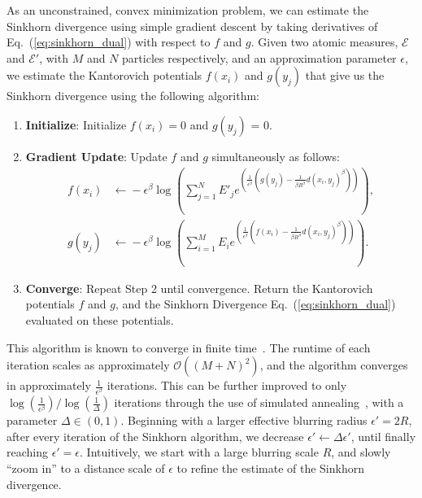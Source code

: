 \documentclass[letterpaper,11pt]{article}
\newcommand{\E}{\mathcal{E}}
\DeclareRobustCommand{\Eq}[1]{Eq.~(\ref{eq:#1})}
\begin{document}


As an unconstrained, convex minimization problem, we can estimate the Sinkhorn divergence using simple gradient descent by taking derivatives of \Eq{sinkhorn_dual} with respect to $f$ and $g$. Given two atomic measures, $\E$ and $\E'$, with $M$ and $N$ particles respectively, and an approximation parameter $\epsilon$, we estimate the Kantorovich potentials $f(x_i)$ and $g(y_j)$ that give us the Sinkhorn divergence using the following algorithm:
%
\begin{enumerate}
    \item \textbf{Initialize}: Initialize $f(x_i) = 0$ and $g(y_j)$ = 0.
    \item \textbf{Gradient Update}: Update $f$ and $g$ simultaneously as follows:
    \begin{align}
    f(x_i) &\xleftarrow{} -\epsilon^\beta \log( \sum_{j=1}^N E'_j e^{\left(\frac{1}{\epsilon^\beta}(g(y_j) - \frac{1}{\beta R^\beta}d(x_i,y_j)^\beta)\right)} ),\\
    g(y_j) &\xleftarrow{} -\epsilon^\beta \log( \sum_{i=1}^M E_i e^{\left(\frac{1}{\epsilon^\beta}(f(x_i) - \frac{1}{\beta R^\beta}d(x_i,y_j)^\beta)\right)} ).
    \end{align}
    \item \textbf{Converge}: Repeat Step 2 until convergence. Return the Kantorovich potentials $f$ and $g$, and the Sinkhorn Divergence \Eq{sinkhorn_dual} evaluated on these potentials.
\end{enumerate}
%
This algorithm is known to converge in finite time~\cite{sinkhorn_1966, sinkhorn1967diagonal, sinkhorn1967concerning}. The runtime of each iteration scales as approximately $\mathcal{O}((M+N)^2)$, and the algorithm converges in approximately $\frac{1}{\epsilon^\beta}$ iterations. This can be further improved to only $\log(\frac{1}{\epsilon^\beta}) / \log(\frac{1}{\Delta})$ iterations through the use of simulated annealing~\cite{KOSOWSKY1994477, Bertsekas}, with a parameter $\Delta \in (0,1)$. Beginning with a larger effective blurring radius $\epsilon' = 2R$, after every iteration of the Sinkhorn algorithm, we decrease $\epsilon' \xleftarrow{} \Delta \epsilon'$, until finally reaching $\epsilon' = \epsilon$. Intuitively, we start with a large blurring scale $R$, and slowly ``zoom in'' to a distance scale of $\epsilon$ to refine the estimate of the Sinkhorn divergence. 
\end{document}
